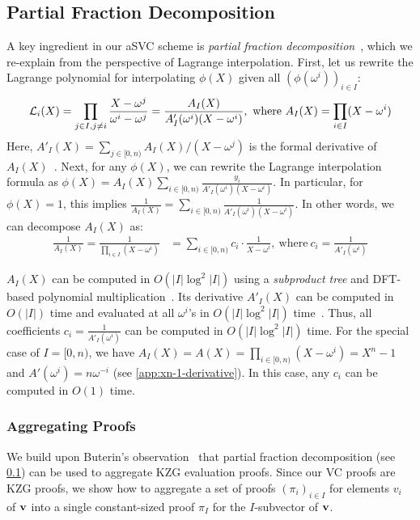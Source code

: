 \subsection{Partial Fraction Decomposition}
\label{s:prelim:partial-fraction-decomposition}

A key ingredient in our aSVC scheme is \textit{partial fraction decomposition}~\cite{PartialFractionDecomposition}, which we re-explain from the perspective of Lagrange interpolation.
First, let us rewrite the Lagrange polynomial for interpolating $\phi(X)$ given all $\left(\phi(\omega^i)\right)_{i\in I}$:
\begin{align}
\label{eq:lagr-poly-rewrite}
\lagr_i(X)=\prod_{j\in I, j\ne i} \frac{X-\omega^j}{\omega^i - \omega^j}=\frac{A_I(X)}{A'_I(\omega^i) (X-\omega^i)},\ \text{where}\ A_I(X)=\prod_{i\in I} (X-\omega^i)
\end{align}
Here, $A'_I(X)=\sum_{j\in[0,n)} A_I(X)/(X-\omega^j)$ is the formal derivative of $A_I(X)$~\cite{vG13ModernCh10}.
Next, for any $\phi(X)$, we can rewrite the Lagrange interpolation formula as $\phi(X) = A_I(X)\sum_{i\in[0,n)} \frac{y_i}{A'_I(\omega^i)(X-\omega^i)}$.
In particular, for $\phi(X)=1$, this implies $\frac{1}{A_I(X)} = \sum_{i\in[0,n)} \frac{1}{A'_I(\omega^i)(X-\omega^i)}$.
In other words, we can decompose $A_I(X)$ as:
\begin{align}
\frac{1}{A_I(X)} = \frac{1}{\prod_{i \in I} (X-\omega^i)} &= \sum_{i\in[0,n)} c_i\cdot \frac{1}{X-\omega^i},\ \text{where}\ c_i=\frac{1}{A'_I(\omega^i)}
\end{align}

$A_I(X)$ can be computed in $O(|I|\log^2{|I|}) $ using a \textit{subproduct tree} and DFT-based polynomial multiplication~\cite{vG13ModernCh10}.
Its derivative $A'_I(X)$ can be computed in $O(|I|)$ time and evaluated at all $\omega^i$'s in $O(|I|\log^2{|I|})$ time~\cite{vG13ModernCh10}.
Thus, all coefficients $c_i=\frac{1}{A'_I(\omega^i)}$ can be computed in $O(|I|\log^2{|I|})$ time.
For the special case of $I=[0,n)$, we have $A_I(X)=A(X)=\prod_{i\in[0,n)} (X-\omega^i)=X^n - 1$ and $A'(\omega^i)=n\omega^{-i}$ (see \cref{app:xn-1-derivative}).
In this case, any $c_i$ can be computed in $O(1)$ time.

\subsubsection{Aggregating Proofs}
\label{s:asvc:from-kzg:aggregating-proofs}
We build upon Buterin's observation~\cite{Buterin20UsingPoly} that partial fraction decomposition (see \cref{s:prelim:partial-fraction-decomposition}) can be used to aggregate KZG evaluation proofs.
Since our VC proofs are KZG proofs, we show how to aggregate a set of proofs $(\pi_i)_{i\in I}$ for elements $v_i$ of $\bm{\mathrm{v}}$ into a single constant-sized proof $\pi_I$ for the $I$-subvector of $\bm{\mathrm{v}}$.

